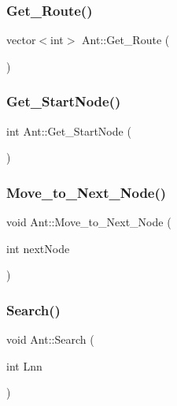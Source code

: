 \subsubsection{\texorpdfstring{Get\+\_\+\+Route()}{Get\_Route()}}
{\footnotesize\ttfamily vector$<$int$>$ Ant\+::\+Get\+\_\+\+Route (\begin{DoxyParamCaption}{ }\end{DoxyParamCaption})\hspace{0.3cm}{\ttfamily [inline]}}

\mbox{\label{class_ant_a6b39f50c57698a6ee11324d125c5e6cb}} 
\subsubsection{\texorpdfstring{Get\+\_\+\+Start\+Node()}{Get\_StartNode()}}
{\footnotesize\ttfamily int Ant\+::\+Get\+\_\+\+Start\+Node (\begin{DoxyParamCaption}{ }\end{DoxyParamCaption})\hspace{0.3cm}{\ttfamily [inline]}}

\mbox{\label{class_ant_af520d2c85aa44726d7ded378b97eab9b}} 
\subsubsection{\texorpdfstring{Move\+\_\+to\+\_\+\+Next\+\_\+\+Node()}{Move\_to\_Next\_Node()}}
{\footnotesize\ttfamily void Ant\+::\+Move\+\_\+to\+\_\+\+Next\+\_\+\+Node (\begin{DoxyParamCaption}\item[{int}]{next\+Node }\end{DoxyParamCaption})}

\mbox{\label{class_ant_a723d84c7f27f716b6632108e196ed513}} 
\subsubsection{\texorpdfstring{Search()}{Search()}}
{\footnotesize\ttfamily void Ant\+::\+Search (\begin{DoxyParamCaption}\item[{int}]{Lnn }\end{DoxyParamCaption})}



